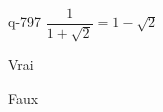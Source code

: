 \begin{truefalse}{q-797}
$\dfrac{1}{1+\sqrt{2}}=1-\sqrt{2}$
\item Vrai
\item* Faux
\end{truefalse}

